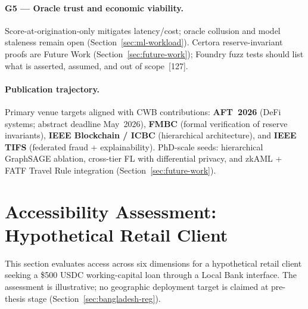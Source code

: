 \documentclass[12pt,a4paper]{report}
\begin{document}
\paragraph{G5 --- Oracle trust and economic viability.}
Score-at-origination-only mitigates latency/cost; oracle collusion and model staleness remain open (Section~\ref{sec:ml-workload}). Certora reserve-invariant proofs are Future Work (Section~\ref{sec:future-work}); Foundry fuzz tests should list what is asserted, assumed, and out of scope~[127].

\paragraph{Publication trajectory.}
Primary venue targets aligned with CWB contributions: \textbf{AFT~2026} (DeFi systems; abstract deadline May~2026), \textbf{FMBC} (formal verification of reserve invariants), \textbf{IEEE Blockchain / ICBC} (hierarchical architecture), and \textbf{IEEE TIFS} (federated fraud + explainability). PhD-scale seeds: hierarchical GraphSAGE ablation, cross-tier FL with differential privacy, and zkAML + FATF Travel Rule integration (Section~\ref{sec:future-work}).

\section{Accessibility Assessment: Hypothetical Retail Client}

This section evaluates access across six dimensions for a hypothetical retail client seeking a \$500 USDC working-capital loan through a Local Bank interface. The assessment is illustrative; no geographic deployment target is claimed at pre-thesis stage (Section~\ref{sec:bangladesh-reg}).
\end{document}
